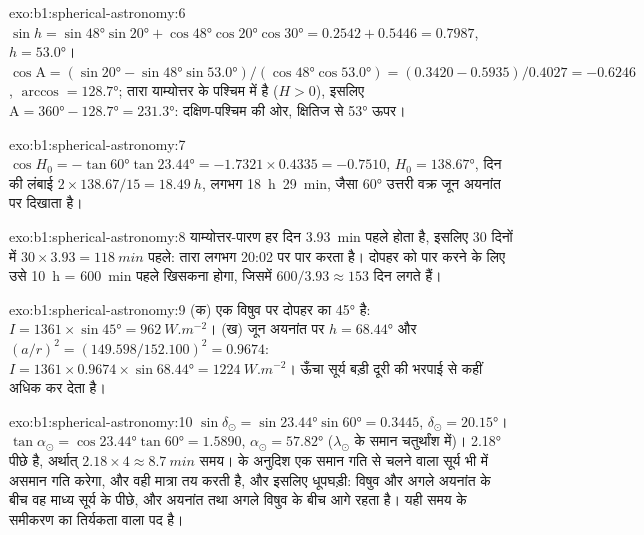 \begin{solution}{exo:b1:spherical-astronomy:6}
$\sin h = \sin\ang{48}\sin\ang{20} + \cos\ang{48}\cos\ang{20}\cos\ang{30}
= 0.2542 + 0.5446 = 0.7987$, $h = \ang{53.0}$।
$\cos\mathrm{A} = (\sin\ang{20} - \sin\ang{48}\sin\ang{53.0})/(\cos\ang{48}
\cos\ang{53.0}) = (0.3420 - 0.5935)/0.4027 = -0.6246$, $\arccos = \ang{128.7}$;
तारा याम्योत्तर के पश्चिम में है ($H > 0$), इसलिए $\mathrm{A} = \ang{360} -
\ang{128.7} = \ang{231.3}$: दक्षिण-पश्चिम की ओर, क्षितिज से \ang{53} ऊपर।
\end{solution}

\begin{solution}{exo:b1:spherical-astronomy:7}
$\cos H_0 = -\tan\ang{60}\tan\ang{23.44} = -1.7321\times0.4335 = -0.7510$,
$H_0 = \ang{138.67}$, दिन की लंबाई $2\times138.67/15 = \qty{18.49}{h}$, लगभग
\qty{18}{h}~\qty{29}{min}, जैसा \ang{60} उत्तरी वक्र जून अयनांत पर दिखाता है।
\end{solution}

\begin{solution}{exo:b1:spherical-astronomy:8}
याम्योत्तर-पारण हर दिन \qty{3.93}{min} पहले होता है, इसलिए 30 दिनों में $30\times3.93 =
\qty{118}{min}$ पहले: तारा लगभग 20:02 पर पार करता है। दोपहर को पार करने के लिए उसे
\qty{10}{h} = \qty{600}{min} पहले खिसकना होगा, जिसमें $600/3.93 \approx 153$ दिन लगते हैं।
\end{solution}

\begin{solution}{exo:b1:spherical-astronomy:9}
(क) एक विषुव पर दोपहर का  \ang{45} है: $I = 1361\times\sin\ang{45}
= \qty{962}{W.m^{-2}}$। (ख) जून अयनांत पर $h = \ang{68.44}$ और
$(a/r)^2 = (149.598/152.100)^2 = 0.9674$:
$I = 1361\times0.9674\times\sin\ang{68.44} = \qty{1224}{W.m^{-2}}$। ऊँचा सूर्य बड़ी दूरी की
भरपाई से कहीं अधिक कर देता है।
\end{solution}

\begin{solution}{exo:b1:spherical-astronomy:10}
$\sin\delta_\odot = \sin\ang{23.44}\sin\ang{60} = 0.3445$,
$\delta_\odot = \ang{20.15}$। $\tan\alpha_\odot = \cos\ang{23.44}\tan\ang{60}
= 1.5890$, $\alpha_\odot = \ang{57.82}$ ($\lambda_\odot$ के समान चतुर्थांश में)।
 \ang{2.18} पीछे है, अर्थात् $2.18\times4 \approx
\qty{8.7}{min}$ समय।  के अनुदिश एक समान गति से चलने वाला सूर्य भी  में
असमान गति करेगा, और वही मात्रा  तय करती है, और इसलिए धूपघड़ी: विषुव और अगले अयनांत
के बीच वह माध्य सूर्य के पीछे, और अयनांत तथा अगले विषुव के बीच आगे रहता है। यही समय के
समीकरण का तिर्यकता वाला पद है।
\end{solution}

